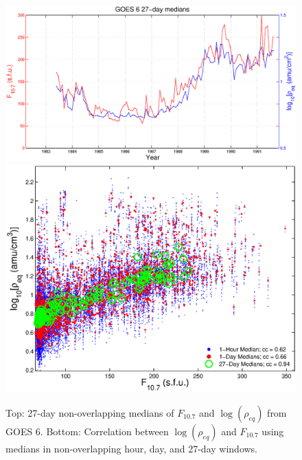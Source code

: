 \documentclass[10pt,twocolumn]{article}
\begin{document}
\begin{figure}[htp!]
\centering
\includegraphics[scale=0.40]{figures/F107MD27d-GOES6.eps}
\includegraphics[scale=0.40]{figures/ccplot-GOES6.eps}
\caption{Top: 27-day non-overlapping medians of $F_{10.7}$ and $\log(\rho_{eq})$ from GOES 6. Bottom: Correlation between $\log(\rho_{eq})$ and $F_{10.7}$ using medians in non-overlapping hour, day, and 27-day windows.}
\label{ccplot}
\end{figure}
\clearpage
\end{document}

